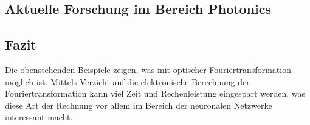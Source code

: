 \subsection{Aktuelle Forschung im Bereich Photonics}

\subsection{Fazit}
Die obenstehenden Beispiele zeigen, was mit optischer Fouriertransformation möglich ist.
Mittels Verzicht auf die elektronische Berechnung der Fouriertransformation kann viel Zeit und Rechenleistung 
eingespart werden, was diese Art der Rechnung vor allem im Bereich der neuronalen Netzwerke interessant macht.
